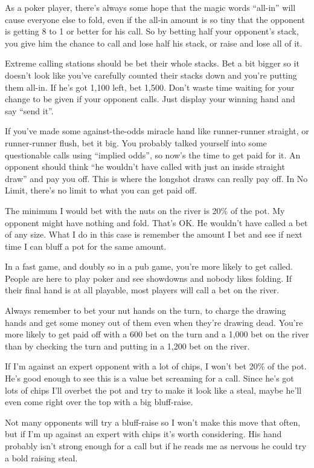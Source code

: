 As a poker player, there's always some hope that the magic words ``all-in''
will cause everyone else to fold, even if the all-in amount is so tiny
that the opponent is getting 8 to 1 or better for his call. So by betting
half your opponent's stack, you give him the chance to call and lose half
his stack, or raise and lose all of it.

Extreme calling stations should be bet their whole stacks. Bet a bit bigger
so it doesn't look like you've carefully counted their stacks down and you're
putting them all-in. If he's got 1,100 left, bet 1,500. Don't waste time
waiting for your change to be given if your opponent calls. Just display
your winning hand and say ``send it''.

If you've made some against-the-odds miracle hand like runner-runner
straight, or runner-runner flush, bet it big. You probably talked
yourself into some questionable calls using ``implied odds'', so now's
the time to get paid for it. An opponent should think ``he wouldn't
have called with just an inside straight draw'' and pay you off. This
is where the longshot draws can really pay off. In No Limit, there's
no limit to what you can get paid off.

The minimum I would bet with the nuts on the river is 20\% of the pot.
My opponent might have nothing and fold. That's OK. He wouldn't have
called a bet of any size. What I do in this case is remember the amount
I bet and see if next time I can bluff a pot for the same amount.

In a fast game, and doubly so in a pub game, you're more likely
to get called. People are here to play poker and see showdowns and
nobody likes folding. If their final hand is at all playable, most
players will call a bet on the river.

Always remember to bet your nut hands on the turn, to charge
the drawing hands and get some money out of them even when they're
drawing dead. You're more likely to get paid off with a 600 bet on the
turn and a 1,000 bet on the river than by checking the turn and putting
in a 1,200 bet on the river.

If I'm against an expert opponent with a lot of chips, I won't bet
20\% of the pot. He's good enough to see this is a value bet screaming
for a call. Since he's got lots of chips I'll overbet the pot and try
to make it look like a steal, maybe he'll even come right over the top
with a big bluff-raise.

Not many opponents will try a bluff-raise so I won't make this move
that often, but if I'm up against an expert with chips it's worth
considering. His hand probably isn't strong enough for a call but if he
reads me as nervous he could try a bold raising steal.

